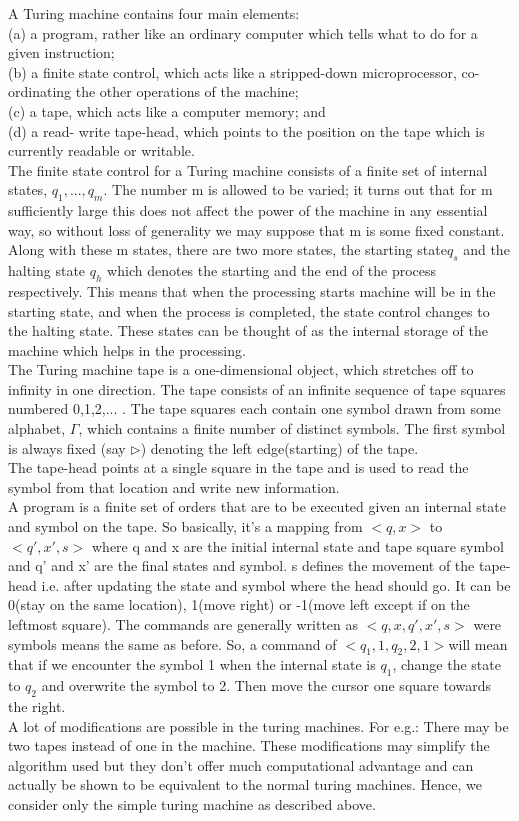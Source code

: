 A Turing machine contains four main elements:\\
(a) a program, rather like an ordinary computer which tells what to do for a given instruction;\\ 
(b) a finite state control, which acts like a stripped-down microprocessor, co-ordinating the other operations of the machine; \\
(c) a tape, which acts like a computer memory; and \\
(d) a read- write tape-head, which points to the position on the tape which is currently readable or writable.\\
The finite state control for a Turing machine consists of a finite set of internal states, {$ q_1 , . . . , q_m $}. The number m is allowed to be varied; it turns out that for m sufficiently large this does not affect the power of the machine in any essential way, so without loss of generality we may suppose that m is some fixed constant. Along with these m states, there are two more states, the starting state{$ q_s $} and the halting state {$ q_h $} which denotes the starting and the end of the process respectively. This means that when the processing starts machine will be in the starting state, and when the process is completed, the state control changes to the halting state. These states can be thought of as the internal storage of the machine which helps in the processing.\\
The Turing machine tape is a one-dimensional object, which stretches off to infinity in one direction. The tape consists of an infinite sequence of tape squares numbered 0,1,2,... . The tape squares each contain one symbol drawn from some alphabet, {$ \Gamma $}, which contains a finite number of distinct symbols. The first symbol is always fixed (say {$ \rhd $}) denoting the left edge(starting) of the tape.\\
The tape-head points at a single square in the tape and is used to read the symbol from that location and write new information.\\
A program is a finite set of orders that are to be executed given an internal state and symbol on the tape. So basically, it's a mapping from {$ <q,x> $} to {$ <q',x',s> $} where q and x are the initial internal state and tape square symbol and q' and x' are the final states and symbol. s defines the movement of the tape-head i.e. after updating the state and symbol where the head should go. It can be 0(stay on the same location), 1(move right) or -1(move left except if on the leftmost square). The commands are generally written as {$ <q,x,q',x',s>$} were symbols means the same as before. So, a command of {$ <q_1,1,q_2,2,1> $}will mean that if we encounter the symbol 1 when the internal state is {$q_1$}, change the state to {$q_2$} and overwrite the symbol to 2. Then move the cursor one square towards the right.\\
A lot of modifications are possible in the turing machines. For e.g.: There may be two tapes instead of one in the machine. These modifications may simplify the algorithm used but they don't offer much computational advantage and can actually be shown to be equivalent to the normal turing machines. Hence, we consider only the simple turing machine as described above.

